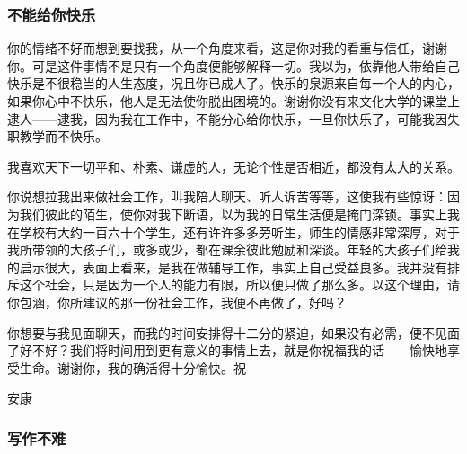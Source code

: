 \subsubsection{不能给你快乐}


\par {}
\par 你的情绪不好而想到要找我，从一个角度来看，这是你对我的看重与信任，谢谢你。可是这件事情不是只有一个角度便能够解释一切。我以为，依靠他人带给自己快乐是不很稳当的人生态度，况且你已成人了。快乐的泉源来自每一个人的内心，如果你心中不快乐，他人是无法使你脱出困境的。谢谢你没有来文化大学的课堂上逮人——逮我，因为我在工作中，不能分心给你快乐，一旦你快乐了，可能我因失职教学而不快乐。
\par 我喜欢天下一切平和、朴素、谦虚的人，无论个性是否相近，都没有太大的关系。
\par 你说想拉我出来做社会工作，叫我陪人聊天、听人诉苦等等，这使我有些惊讶：因为我们彼此的陌生，使你对我下断语，以为我的日常生活便是掩门深锁。事实上我在学校有大约一百六十个学生，还有许许多多旁听生，师生的情感非常深厚，对于我所带领的大孩子们，或多或少，都在课余彼此勉励和深谈。年轻的大孩子们给我的启示很大，表面上看来，是我在做辅导工作，事实上自己受益良多。我并没有排斥这个社会，只是因为一个人的能力有限，所以便只做了那么多。以这个理由，请你包涵，你所建议的那一份社会工作，我便不再做了，好吗？
\par 你想要与我见面聊天，而我的时间安排得十二分的紧迫，如果没有必需，便不见面了好不好？我们将时间用到更有意义的事情上去，就是你祝福我的话——愉快地享受生命。谢谢你，我的确活得十分愉快。祝
\par 安康
\par {}


\subsubsection{写作不难}

